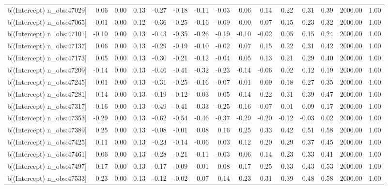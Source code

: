 \begin{table}[ht]
\begin{tabular}{rrrrrrrrrrrrrrr}
  b[(Intercept) n\_obs:47029] & 0.06 & 0.00 & 0.13 & -0.27 & -0.18 & -0.11 & -0.03 & 0.06 & 0.14 & 0.22 & 0.31 & 0.39 & 2000.00 & 1.00 \\ 
  b[(Intercept) n\_obs:47065] & -0.01 & 0.00 & 0.12 & -0.36 & -0.25 & -0.16 & -0.09 & -0.00 & 0.07 & 0.15 & 0.23 & 0.32 & 2000.00 & 1.00 \\ 
  b[(Intercept) n\_obs:47101] & -0.10 & 0.00 & 0.13 & -0.43 & -0.35 & -0.26 & -0.19 & -0.10 & -0.02 & 0.05 & 0.15 & 0.24 & 2000.00 & 1.00 \\ 
  b[(Intercept) n\_obs:47137] & 0.06 & 0.00 & 0.13 & -0.29 & -0.19 & -0.10 & -0.02 & 0.07 & 0.15 & 0.22 & 0.31 & 0.42 & 2000.00 & 1.00 \\ 
  b[(Intercept) n\_obs:47173] & 0.05 & 0.00 & 0.13 & -0.30 & -0.21 & -0.12 & -0.04 & 0.05 & 0.13 & 0.21 & 0.29 & 0.40 & 2000.00 & 1.00 \\ 
  b[(Intercept) n\_obs:47209] & -0.14 & 0.00 & 0.13 & -0.46 & -0.41 & -0.32 & -0.23 & -0.14 & -0.06 & 0.02 & 0.12 & 0.19 & 2000.00 & 1.00 \\ 
  b[(Intercept) n\_obs:47245] & 0.01 & 0.00 & 0.13 & -0.31 & -0.25 & -0.16 & -0.07 & 0.01 & 0.09 & 0.18 & 0.27 & 0.35 & 2000.00 & 1.00 \\ 
  b[(Intercept) n\_obs:47281] & 0.14 & 0.00 & 0.13 & -0.19 & -0.12 & -0.03 & 0.05 & 0.14 & 0.22 & 0.31 & 0.39 & 0.47 & 2000.00 & 1.00 \\ 
  b[(Intercept) n\_obs:47317] & -0.16 & 0.00 & 0.13 & -0.49 & -0.41 & -0.33 & -0.25 & -0.16 & -0.07 & 0.01 & 0.09 & 0.17 & 2000.00 & 1.00 \\ 
  b[(Intercept) n\_obs:47353] & -0.29 & 0.00 & 0.13 & -0.62 & -0.54 & -0.46 & -0.37 & -0.29 & -0.20 & -0.12 & -0.03 & 0.02 & 2000.00 & 1.00 \\ 
  b[(Intercept) n\_obs:47389] & 0.25 & 0.00 & 0.13 & -0.08 & -0.01 & 0.08 & 0.16 & 0.25 & 0.33 & 0.42 & 0.51 & 0.58 & 2000.00 & 1.00 \\ 
  b[(Intercept) n\_obs:47425] & 0.11 & 0.00 & 0.13 & -0.23 & -0.14 & -0.06 & 0.03 & 0.12 & 0.20 & 0.29 & 0.37 & 0.45 & 2000.00 & 1.00 \\ 
  b[(Intercept) n\_obs:47461] & 0.06 & 0.00 & 0.13 & -0.28 & -0.21 & -0.11 & -0.03 & 0.06 & 0.14 & 0.23 & 0.33 & 0.41 & 2000.00 & 1.00 \\ 
  b[(Intercept) n\_obs:47497] & 0.17 & 0.00 & 0.13 & -0.17 & -0.09 & 0.01 & 0.08 & 0.17 & 0.25 & 0.33 & 0.43 & 0.53 & 2000.00 & 1.00 \\ 
  b[(Intercept) n\_obs:47533] & 0.23 & 0.00 & 0.13 & -0.12 & -0.02 & 0.07 & 0.14 & 0.23 & 0.31 & 0.39 & 0.48 & 0.58 & 2000.00 & 1.00 \\ 

\end{tabular}
\end{table}
